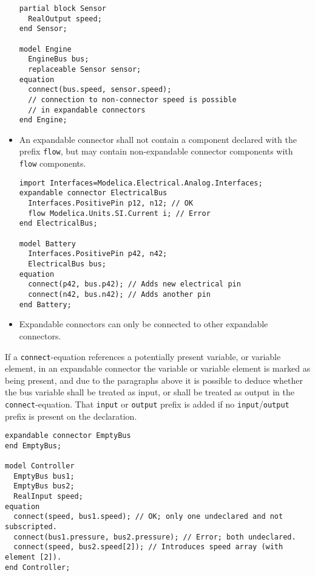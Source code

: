 \begin{itemize}
\begin{example}
\begin{lstlisting}[language=modelica]
partial block Sensor
  RealOutput speed;
end Sensor;

model Engine
  EngineBus bus;
  replaceable Sensor sensor;
equation
  connect(bus.speed, sensor.speed);
  // connection to non-connector speed is possible
  // in expandable connectors
end Engine;
\end{lstlisting}
\end{example}

\item
  An expandable connector shall not contain a component declared with the prefix \lstinline!flow!, but may contain non-expandable connector components with \lstinline!flow! components.
\begin{example}
\begin{lstlisting}[language=modelica]
import Interfaces=Modelica.Electrical.Analog.Interfaces;
expandable connector ElectricalBus
  Interfaces.PositivePin p12, n12; // OK
  flow Modelica.Units.SI.Current i; // Error
end ElectricalBus;

model Battery
  Interfaces.PositivePin p42, n42;
  ElectricalBus bus;
equation
  connect(p42, bus.p42); // Adds new electrical pin
  connect(n42, bus.n42); // Adds another pin
end Battery;
\end{lstlisting}
\end{example}

\item
  Expandable connectors can only be connected to other expandable connectors.
\end{itemize}

If a \lstinline!connect!-equation references a potentially present variable, or variable element, in an expandable connector the variable or variable element is marked as being present, and due to the paragraphs above it is possible to deduce whether the bus variable shall be treated as input, or shall be treated as output in the \lstinline!connect!-equation.
That \lstinline!input! or \lstinline!output! prefix is added if no \lstinline!input!/\lstinline!output! prefix is present on the declaration.

\begin{example}
\begin{lstlisting}[language=modelica]
expandable connector EmptyBus
end EmptyBus;

model Controller
  EmptyBus bus1;
  EmptyBus bus2;
  RealInput speed;
equation
  connect(speed, bus1.speed); // OK; only one undeclared and not subscripted.
  connect(bus1.pressure, bus2.pressure); // Error; both undeclared.
  connect(speed, bus2.speed[2]); // Introduces speed array (with element [2]).
end Controller;
\end{lstlisting}
\end{example}

